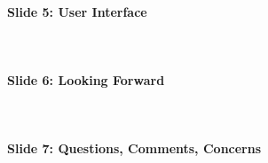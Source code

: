 \documentclass[twoside]{article}
\begin{document}
\paragraph{Slide 5: User Interface} ~\\



\paragraph{Slide 6: Looking Forward} ~\\



\paragraph{Slide 7: Questions, Comments, Concerns} ~\\
\end{document}

